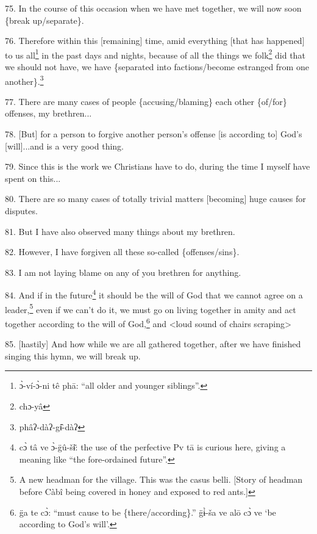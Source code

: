 75. In the course of this occasion when we have met together, we will now soon
\{break up/separate\}.

76. Therefore within this [remaining] time, amid everything [that has happened]
to us all\footnote{ɔ̀-ví-ɔ̀-ni tê phā: ``all older and younger siblings''.} in the past days and nights, because of all the things we folk\footnote{chɔ-yâ}
did that we should not have, we have \{separated into factions/become estranged
from one another\}.\footnote{phâʔ-dàʔ-gɨ̂-dàʔ}

77. There are many cases of people \{accusing/blaming\} each other \{of/for\} offenses,
my brethren...

78. [But] for a person to forgive another person's offense [is according to] God's
[will]...and is a very good thing.

79. Since this is the work we Christians have to do, during the time I myself have
spent on this...

80. There are so many cases of totally trivial matters [becoming] huge causes for
disputes.

81. But I have also observed many things about my brethren.

82. However, I have forgiven all these so-called \{offenses/sins\}.

83. I am not laying blame on any of you brethren for anything.

84. And if in the future\footnote{cɔ̀ tâ ve ɔ̀-g̈û-šɨ̄: the use of the perfective Pv tā is curious here, giving a meaning like ``the fore-ordained future''.} it should be the will of God that we cannot agree on
a leader,\footnote{A new headman for the village. This was the casus belli. [Story of headman before Càbî being covered in honey and exposed to red ants.]} even if we can't do it, we must go on living together in amity and
act together according to the will of God,\footnote{g̈a te cɔ̀: ``must cause to be \{there/according\}.'' g̈ɨ̀-ša ve alō cɔ̀ ve `be according to God's will'.} and <loud sound of chairs
scraping>

85. [hastily] And how while we are all gathered together, after we have finished
singing this hymn, we will break up.

